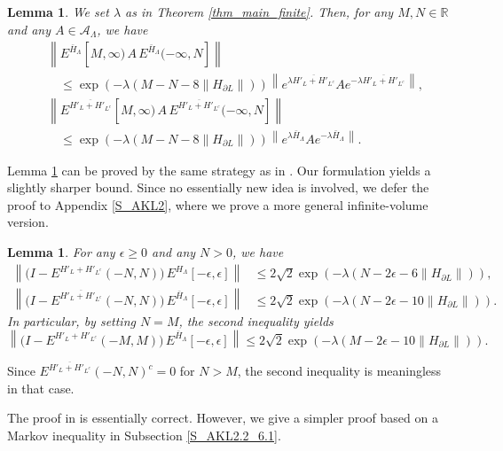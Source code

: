 \documentclass[11pt]{article}
\numberwithin{equation}{section}
\newtheorem{lemma}[theorem]{Lemma}
\begin{document}
\begin{lemma}\label{lem_AKL6.2}
We set $\lambda$ as in Theorem \ref{thm_main_finite}. Then, for any $M,N\in\mathbb{R}$ and any $A\in\mathcal{A}_\Lambda$, we have
\begin{align*}
&\left\|E^{\bar{H}_\Lambda}[M,\infty) \,A\, E^{\bar{H}_\Lambda}(-\infty,N]\right\|\\
&\quad\leq \exp(-\lambda(M-N-8\|H_{\partial L}\|)) \left\|e^{\lambda\overline{H'_L+H'_{L^c}}}Ae^{-\lambda\overline{H'_L+H'_{L^c}}}\right\|,\\
&\left\|E^{\overline{H'_L+H'_{L^c}}}[M,\infty) \,A\, E^{\overline{H'_L+H'_{L^c}}}(-\infty,N]\right\|\\
&\quad\leq \exp\left(-\lambda(M-N-8\|H_{\partial L}\|)\right)\left\| e^{\lambda\bar{H}_\Lambda}Ae^{-\lambda\bar{H}_\Lambda}\right\|.
\end{align*}
\end{lemma}

Lemma \ref{lem_AKL6.2} can be proved by the same strategy as in \cite[Lemma 6.2]{Arad-Kuwahara-Landau 2016}. Our formulation yields a slightly sharper bound. Since no essentially new idea is involved, we defer the proof to Appendix \ref{S_AKL2}, where we prove a more general infinite-volume version.

\begin{lemma}\label{lem_AKL2.2_6.1}
For any $\epsilon\geq0$ and any $N>0$, we have
\begin{align*}
\left\|\Big(I-E^{H'_L+H'_{L^c}}(-N,N)\Big)\, E^{H_\Lambda}[- \epsilon,\epsilon]\right\|
&\leq 2\sqrt{2} \exp(-\lambda(N-2\epsilon-6\|H_{\partial L}\|)),\\
\left\|\Big(I-E^{\overline{H'_L+H'_{L^c}}}(-N,N)\Big)\, E^{\bar{H}_\Lambda}[-\epsilon,\epsilon]\right\|
&\leq 2\sqrt{2} \exp(-\lambda(N-2\epsilon-10\|H_{\partial L}\|)).
\end{align*}
In particular, by setting $N=M$, the second inequality yields
\[
\left\|\Big(I-E^{H'_L+H'_{L^c}}(-M,M)\Big)\, E^{\bar{H}_\Lambda}[-\epsilon,\epsilon]\right\| \leq 2\sqrt{2} \exp(-\lambda(M-2\epsilon-10\|H_{\partial L}\|)).
\]
\end{lemma}

Since $E^{\overline{H'_L+H'_{L^c}}}(-N,N)^c=0$ for $N>M$, the second inequality is meaningless in that case.

The proof in \cite[Theorem 2.2 and Theorem 6.1]{Arad-Kuwahara-Landau 2016} is essentially correct. However, we give a simpler proof based on a Markov inequality in
Subsection \ref{S_AKL2.2_6.1}.
\end{document}
